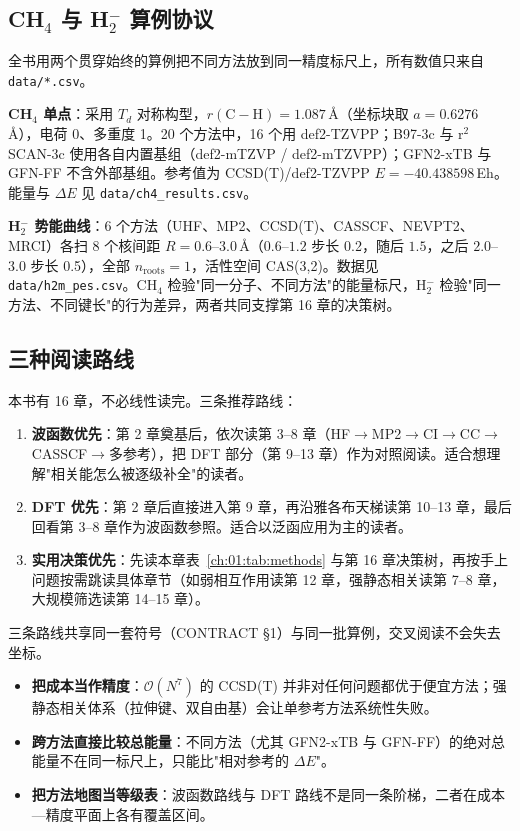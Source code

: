 \subsection{CH$_4$ 与 H$_2^-$ 算例协议}
\label{ch:01:sec:protocols}

全书用两个贯穿始终的算例把不同方法放到同一精度标尺上，所有数值只来自 \texttt{data/*.csv}。

\textbf{CH$_4$ 单点}：采用 $T_d$ 对称构型，$r(\mathrm{C\!-\!H}) = 1.087$\,\AA（坐标块取 $a = 0.6276$\,\AA），电荷 0、多重度 1。20 个方法中，16 个用 def2-TZVPP；B97-3c 与 r$^2$SCAN-3c 使用各自内置基组（def2-mTZVP / def2-mTZVPP）；GFN2-xTB 与 GFN-FF 不含外部基组。参考值为 CCSD(T)/def2-TZVPP $E = -40.438598$\,Eh。能量与 $\Delta E$ 见 \texttt{data/ch4\_results.csv}。

\textbf{H$_2^-$ 势能曲线}：6 个方法（UHF、MP2、CCSD(T)、CASSCF、NEVPT2、MRCI）各扫 8 个核间距 $R = 0.6$–$3.0$\,\AA（$0.6$–$1.2$ 步长 0.2，随后 $1.5$，之后 $2.0$–$3.0$ 步长 0.5），全部 $n_{\mathrm{roots}} = 1$，活性空间 CAS(3,2)。数据见 \texttt{data/h2m\_pes.csv}。CH$_4$ 检验"同一分子、不同方法"的能量标尺，H$_2^-$ 检验"同一方法、不同键长"的行为差异，两者共同支撑第 16 章的决策树。

\subsection{三种阅读路线}
\label{ch:01:sec:routes}

本书有 16 章，不必线性读完。三条推荐路线：

\begin{enumerate}
  \item \textbf{波函数优先}：第 2 章奠基后，依次读第 3--8 章（HF$\to$MP2$\to$CI$\to$CC$\to$CASSCF$\to$多参考），把 DFT 部分（第 9--13 章）作为对照阅读。适合想理解"相关能怎么被逐级补全"的读者。
  \item \textbf{DFT 优先}：第 2 章后直接进入第 9 章，再沿雅各布天梯读第 10--13 章，最后回看第 3--8 章作为波函数参照。适合以泛函应用为主的读者。
  \item \textbf{实用决策优先}：先读本章表~\ref{ch:01:tab:methods} 与第 16 章决策树，再按手上问题按需跳读具体章节（如弱相互作用读第 12 章，强静态相关读第 7--8 章，大规模筛选读第 14--15 章）。
\end{enumerate}

三条路线共享同一套符号（CONTRACT §1）与同一批算例，交叉阅读不会失去坐标。

\begin{pitfall}
\begin{itemize}
  \item \textbf{把成本当作精度}：$\mathcal{O}(N^7)$ 的 CCSD(T) 并非对任何问题都优于便宜方法；强静态相关体系（拉伸键、双自由基）会让单参考方法系统性失败。
  \item \textbf{跨方法直接比较总能量}：不同方法（尤其 GFN2-xTB 与 GFN-FF）的绝对总能量不在同一标尺上，只能比"相对参考的 $\Delta E$"。
  \item \textbf{把方法地图当等级表}：波函数路线与 DFT 路线不是同一条阶梯，二者在成本—精度平面上各有覆盖区间。
\end{itemize}
\end{pitfall}


